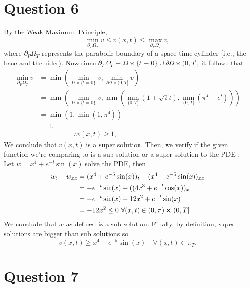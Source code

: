 \documentclass[
	12pt,
	]{article}
\theoremstyle{definition}
\theoremstyle{definition}
\theoremstyle{definition}
\theoremstyle{definition}
\theoremstyle{definition}
\theoremstyle{example}
\theoremstyle{note}
\theoremstyle{remark}
\theoremstyle{example}
\begin{document}
		\section*{Question 6} 
			By the Weak Maximum Principle, 
			$$ \min_{\partial_{P}\Omega_{T}}v \le v(x,t) \le \max_{\partial_{P}\Omega_{T}}v,$$
			where $\partial_{P}\Omega_{T}$ represents the parabolic boundary of a space-time cylinder (i.e., the base and the sides). Now since $\partial_{P}\Omega_{T} = \Omega \times \{ t=0\} \cup \partial \Omega \times (0,T]$, it follows that 
			\begin{align*}
			\min_{\partial_{P}\Omega_{T}}v &= \min \left( \min_{\Omega \times \{ t=0\}}v , \min_{\partial \Omega \times (0,T]}v \right)\\
			&= \min \left(\min_{\Omega \times \{ t=0\}}v , \min \left(\min_{(0,T]}(1+\sqrt{3}t), \min_{(0,T]}(\pi^{4} + e^{t}) \right) \right) \\
			&=\min(1, \min(1, \pi^{4})) \\
			&=1.\\
			&\qquad \quad \qquad \therefore v(x,t) \ge 1,
			\end{align*} 
			We conclude that $v(x,t)$ is a super solution.
			Then, we verify if the given function we're comparing to is a sub solution or a super solution to the PDE ; 
			Let $w = x^{4} + e^{-t}\sin(x)$ solve the PDE, then
			\begin{align*}
				w_{t} -w_{xx} &= (x^{4} + e^{-5}\sin(x))_{t} - (x^{4} + e^{-5}\sin(x))_{xx} \\
				&=  -e^{-t} \sin(x) - ((4x^{3} + e^{-t}\cos(x))_{x} \\
				&= -e^{-t}\sin(x) -12x^{2} +e^{-t}\sin(x) \\
				&= -12 x^{2} \le 0 \ \forall (x,t) \in (0,\pi) \cross (0,T]
			\end{align*}
			We conclude that $w$ as defined is a sub solution. Finally, by definition, super solutions are bigger than sub solutions so
			$$ v(x,t) \ge x^{4} + e^{-5}\sin(x) \quad \forall (x,t) \in \pi_{T}.$$
		\section*{Question 7}
\end{document}
